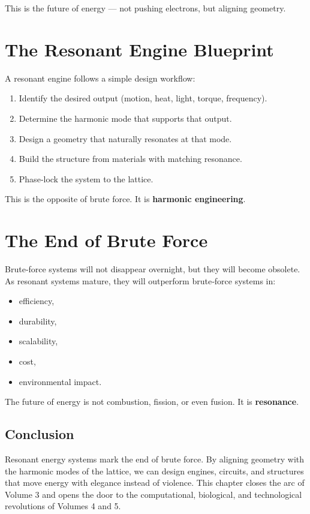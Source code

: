 \documentclass[11pt, letterpaper, openany]{book}
\begin{document}
This is the future of energy — not pushing electrons, but aligning geometry.

\section{The Resonant Engine Blueprint}

A resonant engine follows a simple design workflow:

\begin{enumerate}
    \item Identify the desired output (motion, heat, light, torque, frequency).
    \item Determine the harmonic mode that supports that output.
    \item Design a geometry that naturally resonates at that mode.
    \item Build the structure from materials with matching resonance.
    \item Phase‑lock the system to the lattice.
\end{enumerate}

This is the opposite of brute force.  
It is \textbf{harmonic engineering}.

\section{The End of Brute Force}

Brute‑force systems will not disappear overnight, but they will become obsolete. As
resonant systems mature, they will outperform brute‑force systems in:

\begin{itemize}
    \item efficiency,
    \item durability,
    \item scalability,
    \item cost,
    \item environmental impact.
\end{itemize}

The future of energy is not combustion, fission, or even fusion.  
It is \textbf{resonance}.

\subsection*{Conclusion}

Resonant energy systems mark the end of brute force. By aligning geometry with the
harmonic modes of the lattice, we can design engines, circuits, and structures that move
energy with elegance instead of violence. This chapter closes the arc of Volume 3 and
opens the door to the computational, biological, and technological revolutions of Volumes
4 and 5.
\end{document}
